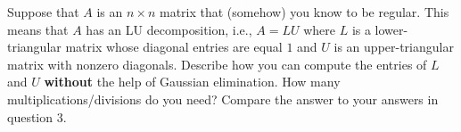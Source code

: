 \documentclass[11pt]{amsart}
\theoremstyle{definition}  %
\begin{document}
\vskip 0.3cm
 Suppose that $A$ is an $n \times n$ matrix that (somehow) you know to be regular. This means that $A$ has an LU decomposition, i.e.,
$A = LU$ where $L$ is a lower-triangular matrix whose diagonal entries are equal $1$ and $U$ is an upper-triangular matrix with nonzero diagonals.
Describe how you can compute the entries of $L$ and $U$ {\bf without} the help of Gaussian elimination. How many multiplications/divisions
do you need? Compare the  answer to  your answers in question 3.
 
\end{document}
